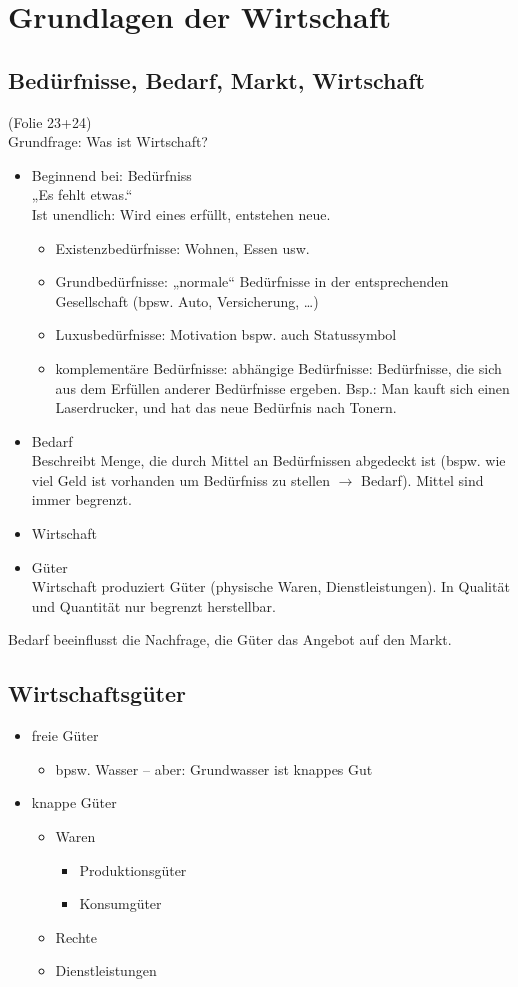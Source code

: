 \section{Grundlagen der Wirtschaft}
\subsection{Bedürfnisse, Bedarf, Markt, Wirtschaft}
(Folie 23+24)\\
Grundfrage: Was ist Wirtschaft?
\begin{itemize}
\item Beginnend bei: Bedürfniss\\
„Es fehlt etwas.“\\
Ist unendlich: Wird eines erfüllt, entstehen neue.
\begin{itemize}
\item Existenzbedürfnisse: Wohnen, Essen usw.
\item Grundbedürfnisse: „normale“ Bedürfnisse in der entsprechenden Gesellschaft (bpsw. Auto, Versicherung, …)
\item Luxusbedürfnisse: Motivation bspw. auch Statussymbol
\item komplementäre Bedürfnisse: abhängige Bedürfnisse: Bedürfnisse, die sich aus dem Erfüllen anderer Bedürfnisse ergeben. Bsp.: Man kauft sich einen Laserdrucker, und hat das neue Bedürfnis nach Tonern.
\end{itemize}
\item Bedarf\\
Beschreibt Menge, die durch Mittel an Bedürfnissen abgedeckt ist (bspw. wie viel Geld ist vorhanden um Bedürfniss zu stellen $\rightarrow$ Bedarf). Mittel sind immer begrenzt.
\item Wirtschaft
\item Güter\\
Wirtschaft produziert Güter (physische Waren, Dienstleistungen). In Qualität und Quantität nur begrenzt herstellbar.
\end{itemize}
Bedarf beeinflusst die Nachfrage, die Güter das Angebot auf den Markt.

\subsection{Wirtschaftsgüter}
\begin{itemize}
\item freie Güter
\begin{itemize}
\item bpsw. Wasser -- aber: Grundwasser ist knappes Gut
\end{itemize}
\item knappe Güter
\begin{itemize}
\item Waren
\begin{itemize}
\item Produktionsgüter
\item Konsumgüter
\end{itemize}
\item Rechte
\item Dienstleistungen
\end{itemize}
\end{itemize}


